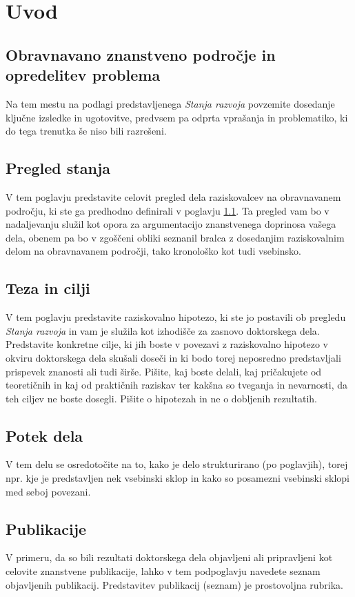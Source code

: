 \chapter{Uvod}\label{cha:uvod}

\section{Obravnavano znanstveno področje in opredelitev problema}\label{sec:predstavitev_problema}
Na tem mestu na podlagi predstavljenega \emph{Stanja razvoja} povzemite dosedanje ključne izsledke in ugotovitve, predvsem pa odprta vprašanja in problematiko, ki do tega trenutka še niso bili razrešeni.

\section{Pregled stanja}\label{sec:pregled_stanja}
V tem poglavju predstavite celovit pregled dela raziskovalcev na obravnavanem področju, ki ste ga predhodno definirali v poglavju \ref{sec:predstavitev_problema}. Ta pregled vam bo v nadaljevanju služil kot opora za argumentacijo znanstvenega doprinosa vašega dela, obenem pa bo v zgoščeni obliki seznanil bralca z dosedanjim raziskovalnim delom na obravnavanem področji, tako kronološko kot tudi vsebinsko.

\section{Teza in cilji}\label{sec:teza}
V tem poglavju predstavite raziskovalno hipotezo, ki ste jo postavili ob pregledu \emph{Stanja razvoja} in vam je služila kot izhodišče za zasnovo doktorskega dela. Predstavite konkretne cilje, ki jih boste v povezavi z raziskovalno hipotezo v okviru doktorskega dela skušali doseči in ki bodo torej neposredno predstavljali prispevek znanosti ali tudi širše. Pišite, kaj boste delali, kaj pričakujete od teoretičnih in kaj od praktičnih raziskav ter kakšna so tveganja in nevarnosti, da teh ciljev ne boste dosegli. Pišite o hipotezah in ne o dobljenih rezultatih.

\section{Potek dela}\label{sec:potek}
V tem delu se osredotočite na to, kako je delo strukturirano (po poglavjih), torej npr. kje je predstavljen nek vsebinski sklop in kako so posamezni vsebinski sklopi med seboj povezani.

\section{Publikacije}\label{sec:publikacije}
V primeru, da so bili rezultati doktorskega dela objavljeni ali pripravljeni kot celovite znanstvene publikacije, lahko v tem podpoglavju navedete seznam objavljenih publikacij. Predstavitev publikacij (seznam) je prostovoljna rubrika.





